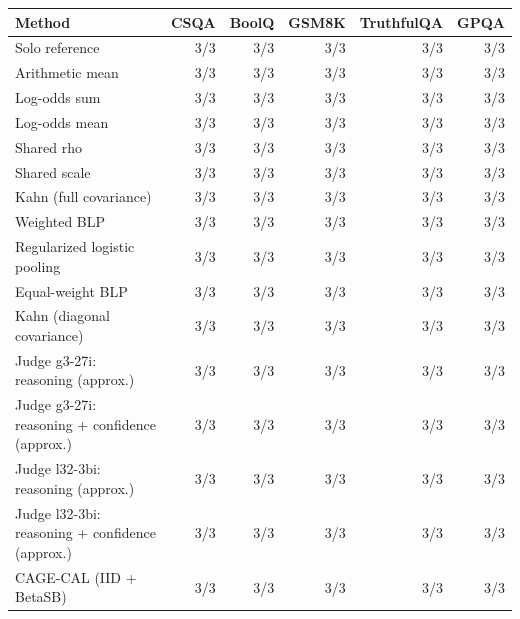 \begin{tabular}{lrrrrr}
\toprule
Method & CSQA & BoolQ & GSM8K & TruthfulQA & GPQA \\
\midrule
Solo reference & 3/3 & 3/3 & 3/3 & 3/3 & 3/3 \\
Arithmetic mean & 3/3 & 3/3 & 3/3 & 3/3 & 3/3 \\
Log-odds sum & 3/3 & 3/3 & 3/3 & 3/3 & 3/3 \\
Log-odds mean & 3/3 & 3/3 & 3/3 & 3/3 & 3/3 \\
Shared rho & 3/3 & 3/3 & 3/3 & 3/3 & 3/3 \\
Shared scale & 3/3 & 3/3 & 3/3 & 3/3 & 3/3 \\
Kahn (full covariance) & 3/3 & 3/3 & 3/3 & 3/3 & 3/3 \\
Weighted BLP & 3/3 & 3/3 & 3/3 & 3/3 & 3/3 \\
Regularized logistic pooling & 3/3 & 3/3 & 3/3 & 3/3 & 3/3 \\
Equal-weight BLP & 3/3 & 3/3 & 3/3 & 3/3 & 3/3 \\
Kahn (diagonal covariance) & 3/3 & 3/3 & 3/3 & 3/3 & 3/3 \\
Judge g3-27i: reasoning (approx.) & 3/3 & 3/3 & 3/3 & 3/3 & 3/3 \\
Judge g3-27i: reasoning + confidence (approx.) & 3/3 & 3/3 & 3/3 & 3/3 & 3/3 \\
Judge l32-3bi: reasoning (approx.) & 3/3 & 3/3 & 3/3 & 3/3 & 3/3 \\
Judge l32-3bi: reasoning + confidence (approx.) & 3/3 & 3/3 & 3/3 & 3/3 & 3/3 \\
CAGE-CAL (IID + BetaSB) & 3/3 & 3/3 & 3/3 & 3/3 & 3/3 \\
\bottomrule
\end{tabular}
